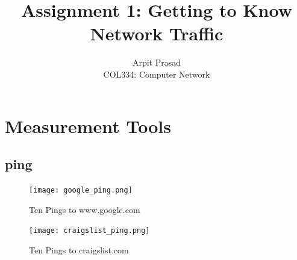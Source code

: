 \documentclass[12pt]{article}
\begin{document}
 
 
\title{Assignment 1: Getting to Know Network Traffic}
\author{Arpit Prasad\\ 
COL334: Computer Network}

\maketitle
\section{Measurement Tools}

\subsection{ping}

\begin{figure}[h!]
    \centering
    \texttt{[image: google\_ping.png]}
    \caption{Ten Pings to www.google.com}
\end{figure}

\begin{figure}[h!]
    \centering
    \texttt{[image: craigslist\_ping.png]}
    \caption{Ten Pings to craigslist.com}
\end{figure}
\end{document}
